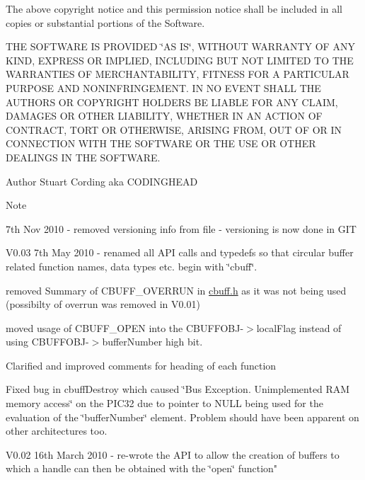 The above copyright notice and this permission notice shall be included in all copies or substantial portions of the Software.

THE SOFTWARE IS PROVIDED \char`\"{}AS IS\char`\"{}, WITHOUT WARRANTY OF ANY KIND, EXPRESS OR IMPLIED, INCLUDING BUT NOT LIMITED TO THE WARRANTIES OF MERCHANTABILITY, FITNESS FOR A PARTICULAR PURPOSE AND NONINFRINGEMENT. IN NO EVENT SHALL THE AUTHORS OR COPYRIGHT HOLDERS BE LIABLE FOR ANY CLAIM, DAMAGES OR OTHER LIABILITY, WHETHER IN AN ACTION OF CONTRACT, TORT OR OTHERWISE, ARISING FROM, OUT OF OR IN CONNECTION WITH THE SOFTWARE OR THE USE OR OTHER DEALINGS IN THE SOFTWARE.

\begin{DoxyAuthor}{Author}
Stuart Cording aka CODINGHEAD
\end{DoxyAuthor}
\begin{DoxyNote}{Note}

\begin{DoxyItemize}
\item 7th Nov 2010 -\/ removed versioning info from file -\/ versioning is now done in GIT
\end{DoxyItemize}
\end{DoxyNote}

\begin{DoxyItemize}
\item V0.03 7th May 2010 -\/ renamed all API calls and typedefs so that circular buffer related function names, data types etc. begin with \char`\"{}cbuff\char`\"{}.
\begin{DoxyItemize}
\item removed Summary of CBUFF\_\-OVERRUN in \hyperlink{cbuff_8h}{cbuff.h} as it was not being used (possibilty of overrun was removed in V0.01)
\item moved usage of CBUFF\_\-OPEN into the CBUFFOBJ-\/$>$localFlag instead of using CBUFFOBJ-\/$>$bufferNumber high bit.
\item Clarified and improved comments for heading of each function
\item Fixed bug in cbuffDestroy which caused \char`\"{}Bus Exception.
 Unimplemented RAM memory access\char`\"{} on the PIC32 due to pointer to NULL being used for the evaluation of the \char`\"{}bufferNumber\char`\"{} element. Problem should have been apparent on other architectures too.
\end{DoxyItemize}
\end{DoxyItemize}


\begin{DoxyItemize}
\item V0.02 16th March 2010 -\/ re-\/wrote the API to allow the creation of buffers to which a handle can then be obtained with the \char`\"{}open\char`\"{} function" 
\end{DoxyItemize}